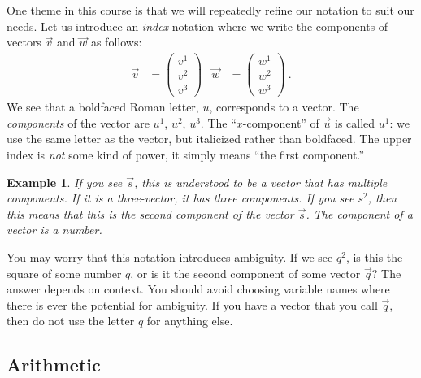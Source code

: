 \documentclass[12pt]{article}
\newtheorem{example}{Example}[section]
\begin{document}
One theme in this course is that we will repeatedly refine our notation to suit our needs. Let us introduce an \emph{index} notation where we write the components of vectors $\vec{v}$ and $\vec{w}$ as follows:
\begin{align}
    \vec{v}
    &=
    \begin{pmatrix}
        v^1 \\ v^2 \\ v^3
    \end{pmatrix}
    &
    \vec{w}
    &=
    \begin{pmatrix}
        w^1 \\ w^2 \\ w^3
    \end{pmatrix} \ .
\end{align}
We see that a boldfaced Roman letter, $u$, corresponds to a vector. The \emph{components} of the vector are $u^1$, $u^2$, $u^3$. The ``$x$-component'' of $\vec{u}$ is called $u^1$: we use the same letter as the vector, but italicized rather than boldfaced. The upper index is \emph{not} some kind of power, it simply means ``the first component.'' 

\begin{example}
If you see $\vec{s}$, this is understood to be a vector that has multiple components. If it is a three-vector, it has three components. If you see $s^2$, then this means that this is the \emph{second component} of the vector $\vec{s}$. The component of a vector is a number. 
\end{example}

You may worry that this notation introduces ambiguity. If we see $q^2$, is this the square of some number $q$, or is it the second component of some vector $\vec{q}$? The answer depends on context. You should avoid choosing variable names where there is ever the potential for ambiguity. If you have a vector that you call $\vec{q}$, then do not use the letter $q$ for anything else.



\subsection{Arithmetic}
\end{document}
